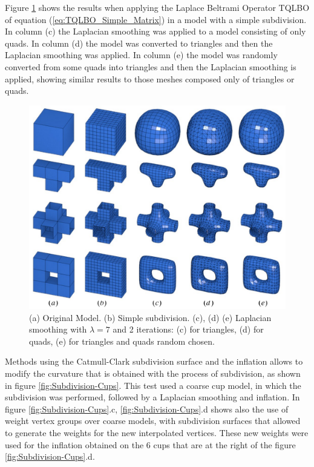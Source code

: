 \documentclass[10pt, conference]{IEEEtran}
\begin{document}
Figure \ref{fig:TQLBO_test} shows the results when applying the Laplace
Beltrami Operator TQLBO of equation (\ref{eq:TQLBO_Simple_Matrix})
in a model with a simple subdivision. In column (c) the Laplacian
smoothing was applied to a model consisting of only quads. In column
(d) the model was converted to triangles and then the Laplacian smoothing
was applied. In column (e) the model was randomly converted from some
quads into triangles and then the Laplacian smoothing is applied,
showing similar results to those meshes composed only of triangles
or quads.

\begin{figure}
\includegraphics[width=1\columnwidth]{figs/test_triangles_quads}

\caption{\label{fig:TQLBO_test}(a) Original Model. (b) Simple subdivision.
(c), (d) (e) Laplacian smoothing with $\lambda=7$ and 2 iterations:
(c) for triangles, (d) for quads, (e) for triangles and quads random
chosen.}
\end{figure}


Methods using the Catmull-Clark subdivision surface and the inflation
allows to modify the curvature that is obtained with the process of
subdivision, as shown in figure \eqref{fig:Subdivision-Cups}. This
test used a coarse cup model, in which the subdivision was performed,
followed by a Laplacian smoothing and inflation. In figure \eqref{fig:Subdivision-Cups}.c,
\eqref{fig:Subdivision-Cups}.d shows also the use of weight vertex
groups over coarse models, with subdivision surfaces that allowed
to generate the weights for the new interpolated vertices. These new
weights were used for the inflation obtained on the 6 cups that
are at the right of the figure \eqref{fig:Subdivision-Cups}.d.
\end{document}
